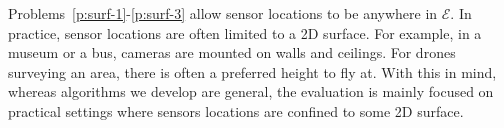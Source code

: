 Problems~\ref{p:surf-1}-\ref{p:surf-3} allow sensor locations to be anywhere in $\mathcal E$. 
In practice, sensor locations are often limited to a 2D surface. 
For example, in a museum or a bus, cameras are mounted on walls and ceilings. 
For drones surveying an area, there is often a preferred height to fly at. 
With this in mind, whereas algorithms we develop are general, 
the evaluation is mainly focused on practical settings where sensors locations are confined to some 2D surface.
